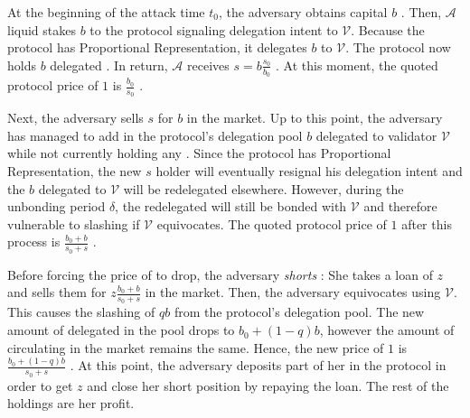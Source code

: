 At the beginning of the attack time $t_0$, the adversary obtains capital
$b$ \asset. Then, $\mathcal{A}$
liquid stakes $b$ \asset to the protocol
signaling delegation intent to $\mathcal{V}$. Because the
protocol has Proportional Representation, it delegates $b$ \asset to $\mathcal{V}$.
The protocol now holds $b$ delegated \asset.
In return, $\mathcal{A}$ receives $s = b \frac{s_0}{b_0}$ \stasset.
At this moment, the quoted protocol price of $1$ \stasset is
$\frac{b_0}{s_0}$ \asset.

Next, the adversary sells $s$ \stasset for $b$ \asset in the market.
Up to this point, the adversary
has managed to add in the protocol's delegation pool $b$
\asset delegated to validator $\mathcal{V}$ while not currently holding
any \stasset.
Since the protocol has Proportional Representation, the new $s$
\stasset holder will eventually resignal his delegation intent and the
$b$ \asset delegated to $\mathcal{V}$ will be redelegated elsewhere.
However, during the unbonding period $\delta$, the redelegated \asset will
still be bonded with $\mathcal{V}$ and therefore vulnerable to slashing
if $\mathcal{V}$ equivocates.
The quoted protocol price of $1$ \stasset after this process
is $\frac{b_0 + b}{s_0 + s}$ \asset.

Before forcing the price of \stasset to drop, the adversary \emph{shorts}
\stasset: She takes a loan of $z$ \stasset and sells them for
$z \frac{b_0 + b}{s_0 + s}$ \asset in the market.
Then, the adversary equivocates using $\mathcal{V}$. This causes the
slashing of $qb$ \asset from the protocol's delegation pool. The new
amount of delegated \asset in the pool drops to $b_0 + (1 - q) b$, however
the amount of \stasset circulating in the market remains the same. Hence,
the new price of $1$ \stasset is $\frac{b_0 + (1 - q) b}{s_0 + s}$ \asset.
At this point, the adversary deposits part of her \asset in the protocol
in order to get $z$ \stasset and close her short position by repaying the loan.
The rest of the \asset holdings are her profit.


